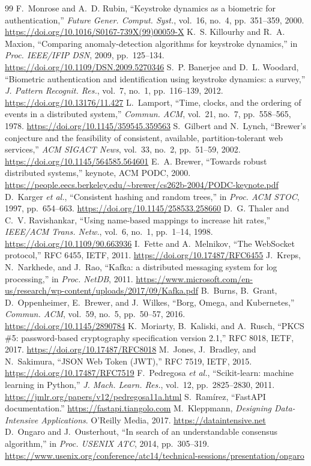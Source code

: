 \documentclass[conference]{IEEEtran}
\begin{document}
\begin{thebibliography}{99}
 F.~Monrose and A.~D. Rubin, ``Keystroke dynamics as a biometric for authentication,'' \emph{Future Gener. Comput. Syst.}, vol.~16, no.~4, pp.~351--359, 2000. \url{https://doi.org/10.1016/S0167-739X(99)00059-X}
 K.~S. Killourhy and R.~A. Maxion, ``Comparing anomaly-detection algorithms for keystroke dynamics,'' in \emph{Proc. IEEE/IFIP DSN}, 2009, pp.~125--134. \url{https://doi.org/10.1109/DSN.2009.5270346}
 S.~P. Banerjee and D.~L. Woodard, ``Biometric authentication and identification using keystroke dynamics: a survey,'' \emph{J. Pattern Recognit. Res.}, vol.~7, no.~1, pp.~116--139, 2012. \url{https://doi.org/10.13176/11.427}
 L.~Lamport, ``Time, clocks, and the ordering of events in a distributed system,'' \emph{Commun. ACM}, vol.~21, no.~7, pp.~558--565, 1978. \url{https://doi.org/10.1145/359545.359563}
 S.~Gilbert and N.~Lynch, ``Brewer's conjecture and the feasibility of consistent, available, partition-tolerant web services,'' \emph{ACM SIGACT News}, vol.~33, no.~2, pp.~51--59, 2002. \url{https://doi.org/10.1145/564585.564601}
 E.~A. Brewer, ``Towards robust distributed systems,'' keynote, ACM PODC, 2000. \url{https://people.eecs.berkeley.edu/~brewer/cs262b-2004/PODC-keynote.pdf}
 D.~Karger \emph{et al.}, ``Consistent hashing and random trees,'' in \emph{Proc. ACM STOC}, 1997, pp.~654--663. \url{https://doi.org/10.1145/258533.258660}
 D.~G. Thaler and C.~V. Ravishankar, ``Using name-based mappings to increase hit rates,'' \emph{IEEE/ACM Trans. Netw.}, vol.~6, no.~1, pp.~1--14, 1998. \url{https://doi.org/10.1109/90.663936}
 I.~Fette and A.~Melnikov, ``The WebSocket protocol,'' RFC 6455, IETF, 2011. \url{https://doi.org/10.17487/RFC6455}
 J.~Kreps, N.~Narkhede, and J.~Rao, ``Kafka: a distributed messaging system for log processing,'' in \emph{Proc. NetDB}, 2011. \url{https://www.microsoft.com/en-us/research/wp-content/uploads/2017/09/Kafka.pdf}
 B.~Burns, B.~Grant, D.~Oppenheimer, E.~Brewer, and J.~Wilkes, ``Borg, Omega, and Kubernetes,'' \emph{Commun. ACM}, vol.~59, no.~5, pp.~50--57, 2016. \url{https://doi.org/10.1145/2890784}
 K.~Moriarty, B.~Kaliski, and A.~Rusch, ``PKCS \#5: password-based cryptography specification version 2.1,'' RFC 8018, IETF, 2017. \url{https://doi.org/10.17487/RFC8018}
 M.~Jones, J.~Bradley, and N.~Sakimura, ``JSON Web Token (JWT),'' RFC 7519, IETF, 2015. \url{https://doi.org/10.17487/RFC7519}
 F.~Pedregosa \emph{et al.}, ``Scikit-learn: machine learning in Python,'' \emph{J. Mach. Learn. Res.}, vol.~12, pp.~2825--2830, 2011. \url{https://jmlr.org/papers/v12/pedregosa11a.html}
 S.~Ram\'irez, ``FastAPI documentation.'' \url{https://fastapi.tiangolo.com}
 M.~Kleppmann, \emph{Designing Data-Intensive Applications}. O'Reilly Media, 2017. \url{https://dataintensive.net}
 D.~Ongaro and J.~Ousterhout, ``In search of an understandable consensus algorithm,'' in \emph{Proc. USENIX ATC}, 2014, pp.~305--319. \url{https://www.usenix.org/conference/atc14/technical-sessions/presentation/ongaro}
\end{thebibliography}
\end{document}
